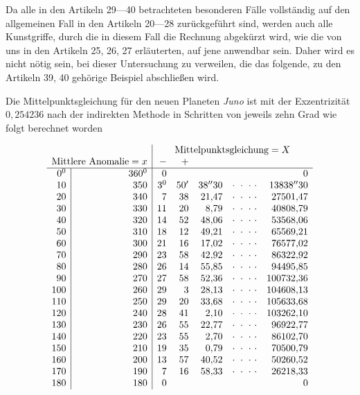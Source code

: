 \begingroup
\renewcommand{\arraystretch}{1.45}

Da alle in den Artikeln 29---40 betrachteten besonderen Fälle vollständig auf den allgemeinen Fall in den Artikeln 20---28 zurückgeführt sind, werden auch alle Kunstgriffe, durch die in diesem Fall die Rechnung abgekürzt wird, wie die von uns in den Artikeln 25, 26, 27 erläuterten, auf jene anwendbar sein. Daher wird es nicht nötig sein, bei dieser Untersuchung zu verweilen, die das folgende, zu den Artikeln 39, 40 gehörige Beispiel abschließen wird.

Die Mittelpunktsgleichung für den neuen Planeten \textit{Juno} ist mit der Exzentrizität \(0{,}254236\) nach der indirekten Methode in Schritten von jeweils zehn Grad wie folgt berechnet worden

\[
\begin{array}{r|r|rrrcr}
\multicolumn{2}{c|}{}&
\multicolumn{5}{c}{\text{Mittelpunktsgleichung}=X}\\
\multicolumn{2}{r|}{\text{Mittlere Anomalie}=x}&-&+&&&\\ \hline
0^{\mathord{0}}&360^{\mathord{0}}&0&&&&0\\
10&350&3^{\mathord{0}}&50'&38''30&\cdot\ \cdot\ \cdot\ \cdot&13838''30\\
20&340&7&38&21{,}47&\cdot\ \cdot\ \cdot\ \cdot&27501{,}47\\
30&330&11&20&8{,}79&\cdot\ \cdot\ \cdot\ \cdot&40808{,}79\\
40&320&14&52&48{,}06&\cdot\ \cdot\ \cdot\ \cdot&53568{,}06\\
50&310&18&12&49{,}21&\cdot\ \cdot\ \cdot\ \cdot&65569{,}21\\
60&300&21&16&17{,}02&\cdot\ \cdot\ \cdot\ \cdot&76577{,}02\\
70&290&23&58&42{,}92&\cdot\ \cdot\ \cdot\ \cdot&86322{,}92\\
80&280&26&14&55{,}85&\cdot\ \cdot\ \cdot\ \cdot&94495{,}85\\
90&270&27&58&52{,}36&\cdot\ \cdot\ \cdot\ \cdot&100732{,}36\\
100&260&29&3&28{,}13&\cdot\ \cdot\ \cdot\ \cdot&104608{,}13\\
110&250&29&20&33{,}68&\cdot\ \cdot\ \cdot\ \cdot&105633{,}68\\
120&240&28&41&2{,}10&\cdot\ \cdot\ \cdot\ \cdot&103262{,}10\\
130&230&26&55&22{,}77&\cdot\ \cdot\ \cdot\ \cdot&96922{,}77\\
140&220&23&55&2{,}70&\cdot\ \cdot\ \cdot\ \cdot&86102{,}70\\
150&210&19&35&0{,}79&\cdot\ \cdot\ \cdot\ \cdot&70500{,}79\\
160&200&13&57&40{,}52&\cdot\ \cdot\ \cdot\ \cdot&50260{,}52\\
170&190&7&16&58{,}33&\cdot\ \cdot\ \cdot\ \cdot&26218{,}33\\
180&180&0&&&&0
\end{array}
\]

